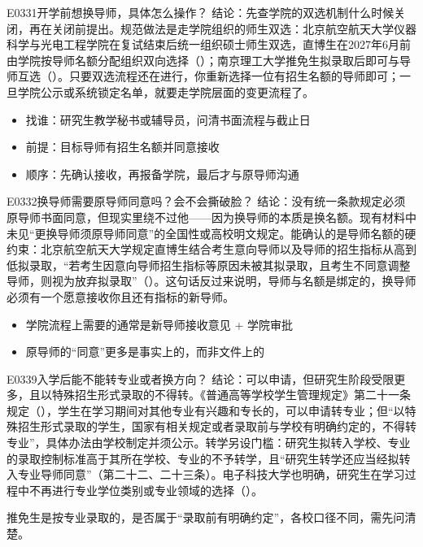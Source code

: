 \begin{qa}{E0331}{开学前想换导师，具体怎么操作？}
结论：先查学院的双选机制什么时候关闭，再在关闭前提出。规范做法是走学院组织的师生双选：北京航空航天大学仪器科学与光电工程学院在复试结束后统一组织硕士师生双选，直博生在2027年6月前由学院按导师名额分配组织双向选择（）；南京理工大学推免生拟录取后即可与导师互选（）。只要双选流程还在进行，你重新选择一位有招生名额的导师即可；一旦学院公示或系统锁定名单，就要走学院层面的变更流程了。

\begin{itemize}
  \item 找谁：研究生教学秘书或辅导员，问清书面流程与截止日
  \item 前提：目标导师有招生名额并同意接收
  \item 顺序：先确认接收，再报备学院，最后才与原导师沟通
\end{itemize}
\end{qa}

\begin{qa}{E0332}{换导师需要原导师同意吗？会不会撕破脸？}
结论：没有统一条款规定必须原导师书面同意，但现实里绕不过他——因为换导师的本质是换名额。现有材料中未见“更换导师须原导师同意”的全国性或高校明文规定。能确认的是导师名额的硬约束：北京航空航天大学规定直博生结合考生意向导师以及导师的招生指标从高到低拟录取，“若考生因意向导师招生指标等原因未被其拟录取，且考生不同意调整导师，则视为放弃拟录取”（）。这句话反过来说明，导师与名额是绑定的，换导师必须有一个愿意接收你且还有指标的新导师。

\begin{itemize}
  \item 学院流程上需要的通常是新导师接收意见 + 学院审批
  \item 原导师的“同意”更多是事实上的，而非文件上的
\end{itemize}
\end{qa}

\begin{qa}{E0339}{入学后能不能转专业或者换方向？}
结论：可以申请，但研究生阶段受限更多，且以特殊招生形式录取的不得转。《普通高等学校学生管理规定》第二十一条规定（），学生在学习期间对其他专业有兴趣和专长的，可以申请转专业；但“以特殊招生形式录取的学生，国家有相关规定或者录取前与学校有明确约定的，不得转专业”，具体办法由学校制定并须公示。转学另设门槛：研究生拟转入学校、专业的录取控制标准高于其所在学校、专业的不予转学，且“研究生转学还应当经拟转入专业导师同意”（第二十二、二十三条）。电子科技大学也明确，研究生在学习过程中不再进行专业学位类别或专业领域的选择（）。

推免生是按专业录取的，是否属于“录取前有明确约定”，各校口径不同，需先问清楚。
\end{qa}

